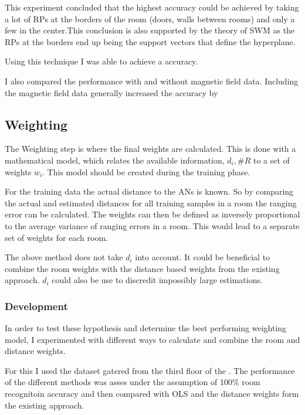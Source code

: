 This experiment concluded that the highest accuracy could be achieved by taking a lot of RPs at the borders of the room (doors, walls between rooms) and only a few in the center.This conclusion is also supported by the theory of SWM as the RPs at the borders end up being the support vectors that define the hyperplane.

Using this technique I was able to achieve a  accuracy. 

I also compared the performance with and without magnetic field data. Including the magnetic field data generally increased the accuracy by 

\subsection{Weighting}

The Weighting step is where the final weights are calculated. This is done with a mathematical model, which relates the available information, \(d_i,\#R\) to a set of weights \(w_i\). This model should be created during the training phase.

For the training data the actual distance to the ANs is known. So by comparing the actual and estimated distances for all training samples in a room the ranging error can be calculated. The weights can then be defined as inversely proportional to the average variance of ranging errors in a room. This would lead to a separate set of weights for each room.

The above method does not take \(d_i\) into account. It could be beneficial to combine the room weights with the distance based weights from the existing approach. \(d_i\) could also be use to discredit impossibly large estimations.

\subsubsection{Development}
\label{WeightingModelDefinition}

In order to test these hypothesis and determine the best performing weighting model, I experimented with different ways to calculate and combine the room and distance weights.

For this I used the dataset gatered from the third floor of the . The performance of the different methods was asses under the assumption of 100\% room recognitoin accuracy and then compared with OLS and the distance weights form the existing approach.

